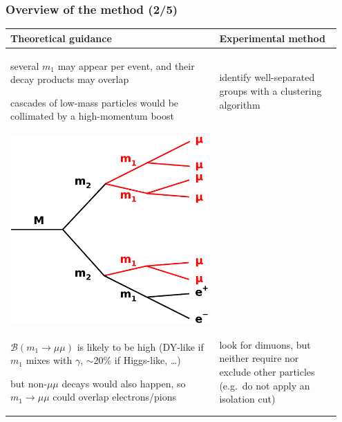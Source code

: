 \documentclass[compress]{beamer}
\begin{document}
\begin{frame}
\frametitle{Overview of the method (2/5)}

\renewcommand{\arraystretch}{1.7}
\begin{tabular}{p{0.6\linewidth} | p{0.35\linewidth}}
Theoretical guidance & Experimental method \\\hline

several $m_1$ may appear per event, and their decay products may overlap

cascades of low-mass particles would be collimated by a high-momentum boost & identify well-separated groups with a clustering algorithm \\

\centering \includegraphics[width=0.55\linewidth]{basic_picture5.pdf} & \\

$\mathcal{B}(m_1 \to \mu\mu)$ is likely to be high (DY-like if $m_1$ mixes with $\gamma$, $\sim$20\% if Higgs-like, \ldots)

\vspace{0.2 cm}
but non-$\mu\mu$ decays would also happen, so $m_1 \to \mu\mu$ could overlap electrons/pions & look for dimuons, but neither require nor exclude other particles (e.g.\ do not apply an isolation cut) \\
\end{tabular}
\end{frame}
\end{document}

